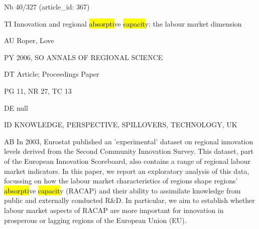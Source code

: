 \documentclass[a4paper]{article}
\begin{document}
\vspace*{-2cm}
Nb \tabto{0cm}40/327 (article\_id: 367)\par
TI \tabto{0cm}Innovation and regional \hl{absorpti}ve \hl{capacit}y: the labour market dimension\par
AU \tabto{0cm}Roper, Love\par
PY \tabto{0cm}2006, SO ANNALS OF REGIONAL SCIENCE\par
DT \tabto{0cm}Article; Proceedings Paper\par
PG \tabto{0cm}11, NR 27, TC 13\par
DE \tabto{0cm}null\par
ID \tabto{0cm}KNOWLEDGE, PERSPECTIVE, SPILLOVERS, TECHNOLOGY, UK\par
AB \tabto{0cm}In 2003, Eurostat published an 'experimental' dataset on regional innovation levels derived from the Second Community Innovation Survey. This dataset, part of the European Innovation Scoreboard, also contains a range of regional labour market indicators. In this paper, we report an exploratory analysis of this data, focussing on how the labour market characteristics of regions shape regions' \hl{absorpti}ve \hl{capacit}y (RACAP) and their ability to assimilate knowledge from public and externally conducted R\&D. In particular, we aim to establish whether labour market aspects of RACAP are more important for innovation in prosperous or lagging regions of the European Union (EU).\par
\clearpage
\end{document}
